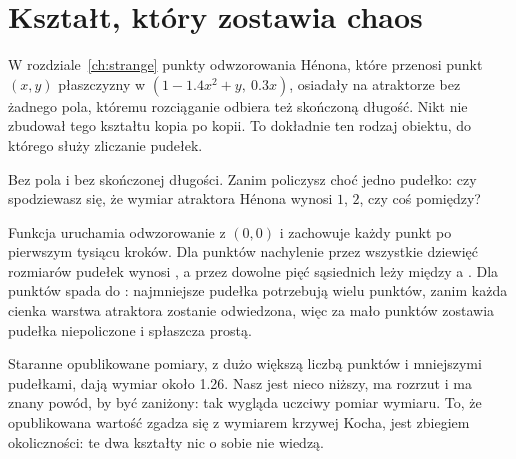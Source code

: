 \section{Kształt, który zostawia chaos}
\label{sec:ch11-henon}

\noindent
W rozdziale~\ref{ch:strange} punkty odwzorowania Hénona, które przenosi punkt
$(x, y)$ płaszczyzny w $(1 - \num{1.4}x^{2} + y,\ \num{0.3}x)$, osiadały na
atraktorze bez żadnego pola, któremu rozciąganie odbiera też skończoną
długość. Nikt nie zbudował tego kształtu kopia po kopii. To dokładnie ten
rodzaj obiektu, do którego służy zliczanie pudełek.

\begin{think}
Bez pola i bez skończonej długości. Zanim policzysz choć jedno pudełko: czy
spodziewasz się, że wymiar atraktora Hénona wynosi $1$, $2$, czy coś
pomiędzy?
\end{think}



\noindent
Funkcja  uruchamia odwzorowanie z $(0, 0)$ i zachowuje
każdy punkt po pierwszym tysiącu kroków. Dla  punktów
nachylenie przez wszystkie dziewięć rozmiarów pudełek wynosi
, a przez dowolne pięć sąsiednich leży między
 a . Dla
 punktów spada do : najmniejsze
pudełka potrzebują wielu punktów, zanim każda cienka warstwa atraktora
zostanie odwiedzona, więc za mało punktów zostawia pudełka niepoliczone i
spłaszcza prostą.

Staranne opublikowane pomiary, z dużo większą liczbą punktów i mniejszymi
pudełkami, dają wymiar około \num{1.26}. Nasz jest nieco niższy, ma rozrzut
i ma znany powód, by być zaniżony: tak wygląda uczciwy pomiar wymiaru. To,
że opublikowana wartość zgadza się z wymiarem krzywej Kocha, jest zbiegiem
okoliczności: te dwa kształty nic o sobie nie wiedzą.


